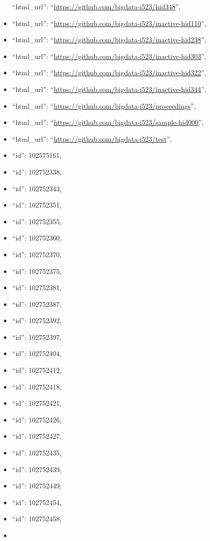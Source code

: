 \begin{itemize}
  ``html\_url'': ``\url{https://github.com/bigdata-i523/hid348}'',
\item
  ``html\_url'':
  ``\url{https://github.com/bigdata-i523/inactive-hid110}'',
\item
  ``html\_url'':
  ``\url{https://github.com/bigdata-i523/inactive-hid238}'',
\item
  ``html\_url'':
  ``\url{https://github.com/bigdata-i523/inactive-hid303}'',
\item
  ``html\_url'':
  ``\url{https://github.com/bigdata-i523/inactive-hid322}'',
\item
  ``html\_url'':
  ``\url{https://github.com/bigdata-i523/inactive-hid344}'',
\item
  ``html\_url'': ``\url{https://github.com/bigdata-i523/proceedings}'',
\item
  ``html\_url'':
  ``\url{https://github.com/bigdata-i523/sample-hid000}'',
\item
  ``html\_url'': ``\url{https://github.com/bigdata-i523/test}'',
\item
  ``id'': 102575161,
\item
  ``id'': 102752338,
\item
  ``id'': 102752343,
\item
  ``id'': 102752351,
\item
  ``id'': 102752355,
\item
  ``id'': 102752360,
\item
  ``id'': 102752370,
\item
  ``id'': 102752375,
\item
  ``id'': 102752381,
\item
  ``id'': 102752387,
\item
  ``id'': 102752392,
\item
  ``id'': 102752397,
\item
  ``id'': 102752404,
\item
  ``id'': 102752412,
\item
  ``id'': 102752418,
\item
  ``id'': 102752421,
\item
  ``id'': 102752426,
\item
  ``id'': 102752427,
\item
  ``id'': 102752435,
\item
  ``id'': 102752439,
\item
  ``id'': 102752449,
\item
  ``id'': 102752454,
\item
  ``id'': 102752458,
\item

\end{itemize}

